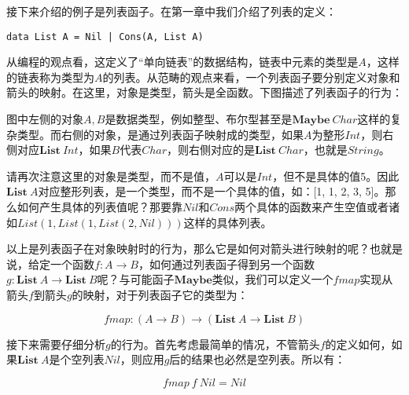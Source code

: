 \documentclass{article}
\begin{document}
\begin{example}
接下来介绍的例子是列表函子。在第一章中我们介绍了列表的定义：

\lstset{frame=none}
\begin{lstlisting}
data List A = Nil | Cons(A, List A)
\end{lstlisting}

从编程的观点看，这定义了“单向链表”的数据结构，链表中元素的类型是$A$，这样的链表称为类型为$A$的列表。从范畴的观点来看，一个列表函子要分别定义对象和箭头的映射。在这里，对象是类型，箭头是全函数。下图描述了列表函子的行为：

\begin{center}
\end{center}

图中左侧的对象$A, B$是数据类型，例如整型、布尔型甚至是$\mathbf{Maybe}\ Char$这样的复杂类型。而右侧的对象，是通过列表函子映射成的类型，如果$A$为整形$Int$，则右侧对应$\mathbf{List}\ Int$，如果$B$代表$Char$，则右侧对应的是$\mathbf{List}\ Char$，也就是$String$。

请再次注意这里的对象是类型，而不是值，$A$可以是$Int$，但不是具体的值5。因此$\mathbf{List}\ A$对应整形列表，是一个类型，而不是一个具体的值，如：[1, 1, 2, 3, 5]。那么如何产生具体的列表值呢？那要靠$Nil$和$Cons$两个具体的函数来产生空值或者诸如$List(1, List(1, List(2, Nil)))$这样的具体列表。

以上是列表函子在对象映射时的行为，那么它是如何对箭头进行映射的呢？也就是说，给定一个函数$f: A \to B$，如何通过列表函子得到另一个函数$g: \mathbf{List}\ A \to \mathbf{List}\ B$呢？与可能函子$\mathbf{Maybe}$类似，我们可以定义一个$fmap$实现从箭头$f$到箭头$g$的映射，对于列表函子它的类型为：

\[
fmap: (A \to B) \to (\mathbf{List}\ A \to \mathbf{List}\ B)
\]

接下来需要仔细分析$g$的行为。首先考虑最简单的情况，不管箭头$f$的定义如何，如果$\mathbf{List}\ A$是个空列表$Nil$，则应用$g$后的结果也必然是空列表。所以有：

\[
fmap\ f\ Nil = Nil
\]


\end{example}
\end{document}
